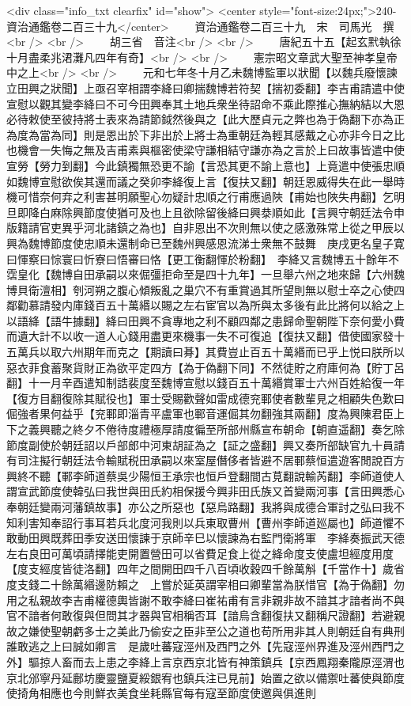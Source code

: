<div class="info_txt clearfix" id="show">
<center style="font-size:24px;">240-資治通鑑卷二百三十九</center>
  　　資治通鑑卷二百三十九　宋　司馬光　撰<br />
<br />
　　胡三省　音注<br />
<br />
　　唐紀五十五【起玄黓執徐十月盡柔兆涒灘凡四年有奇】<br />
<br />
　　憲宗昭文章武大聖至神孝皇帝中之上<br />
<br />
　　元和七年冬十月乙未魏博監軍以狀聞【以魏兵廢懷諫立田興之狀聞】上亟召宰相謂李絳曰卿揣魏博若符契【揣初委翻】李吉甫請遣中使宣慰以觀其變李絳曰不可今田興奉其土地兵衆坐待詔命不乘此際推心撫納結以大恩必待敕使至彼持將士表來為請節鉞然後與之【此大歷貞元之弊也為于偽翻下亦為正為度為當為同】則是恩出於下非出於上將士為重朝廷為輕其感戴之心亦非今日之比也機會一失悔之無及吉甫素與樞密使梁守謙相結守謙亦為之言於上曰故事皆遣中使宣勞【勞力到翻】今此鎮獨無恐更不諭【言恐其更不諭上意也】上竟遣中使張忠順如魏博宣慰欲俟其還而議之癸卯李絳復上言【復扶又翻】朝廷恩威得失在此一舉時機可惜奈何弃之利害甚明願聖心勿疑計忠順之行甫應過陜【甫始也陜失冉翻】乞明旦即降白麻除興節度使猶可及也上且欲除留後絳曰興㳟順如此【言興守朝廷法令申版籍請官吏異乎河北諸鎮之為也】自非恩出不次則無以使之感激殊常上從之甲辰以興為魏博節度使忠順未還制命已至魏州興感恩流涕士衆無不鼓舞　庚戌更名皇子寛曰惲察曰悰寰曰忻寮曰悟審曰恪【更工衡翻惲於粉翻】　李絳又言魏博五十餘年不霑皇化【魏博自田承嗣以來倔彊拒命至是四十九年】一旦舉六州之地來歸【六州魏博貝衛澶相】刳河朔之腹心傾叛亂之巢穴不有重賞過其所望則無以慰士卒之心使四鄰勸慕請發内庫錢百五十萬緡以賜之左右宦官以為所與太多後有此比將何以給之上以語絳【語牛據翻】絳曰田興不貪專地之利不顧四鄰之患歸命聖朝陛下奈何愛小費而遺大計不以收一道人心錢用盡更來機事一失不可復追【復扶又翻】借使國家發十五萬兵以取六州期年而克之【期讀曰朞】其費豈止百五十萬緡而已乎上悦曰朕所以惡衣菲食蓄聚貨財正為欲平定四方【為于偽翻下同】不然徒貯之府庫何為【貯丁呂翻】十一月辛酉遣知制誥裴度至魏博宣慰以錢百五十萬緡賞軍士六州百姓給復一年【復方目翻復除其賦役也】軍士受賜歡聲如雷成德兖鄆使者數輩見之相顧失色歎曰倔強者果何益乎【兖鄆即淄青平盧軍也鄆音運倔其勿翻強其兩翻】度為興陳君臣上下之義興聽之終夕不倦待度禮極厚請度徧至所部州縣宣布朝命【朝直遥翻】奏乞除節度副使於朝廷詔以戶部郎中河東胡証為之【証之盛翻】興又奏所部缺官九十員請有司注擬行朝廷法令輸賦税田承嗣以來室屋僭侈者皆避不居鄆蔡恒遣遊客閒說百方興終不聽【鄆李師道蔡吳少陽恒王承宗也恒戶登翻間古莧翻說輸芮翻】李師道使人謂宣武節度使韓弘曰我世與田氏約相保援今興非田氏族又首變兩河事【言田興悉心奉朝廷變兩河藩鎮故事】亦公之所惡也【惡烏路翻】我將與成德合軍討之弘曰我不知利害知奉詔行事耳若兵北度河我則以兵東取曹州【曹州李師道廵屬也】師道懼不敢動田興既葬田季安送田懷諫于京師辛巳以懷諫為右監門衛將軍　李絳奏振武天德左右良田可萬頃請擇能吏開置營田可以省費足食上從之絳命度支使盧坦經度用度【度支經度皆徒洛翻】四年之間開田四千八百頃收穀四千餘萬斛【千當作十】歲省度支錢二十餘萬緡邊防賴之　上嘗於延英謂宰相曰卿輩當為朕惜官【為于偽翻】勿用之私親故李吉甫權德輿皆謝不敢李絳曰崔祐甫有言非親非故不諳其才諳者尚不與官不諳者何敢復與但問其才器與官相稱否耳【諳烏含翻復扶又翻稱尺證翻】若避親故之嫌使聖朝虧多士之美此乃偷安之臣非至公之道也苟所用非其人則朝廷自有典刑誰敢逃之上曰誠如卿言　是歲吐蕃寇涇州及西門之外【先寇涇州界進及涇州西門之外】驅掠人畜而去上患之李絳上言京西京北皆有神策鎮兵【京西鳳翔秦隴原涇渭也京北邠寧丹延鄜坊慶靈鹽夏綏銀宥也鎮兵注已見前】始置之欲以備禦吐蕃使與節度使掎角相應也今則鮮衣美食坐耗縣官每有寇至節度使邀與俱進則